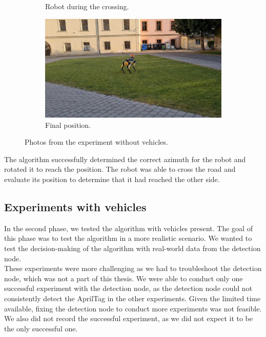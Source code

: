 \begin{figure}[ht]
\begin{subfigure}{0.49\textwidth}
                    \caption{Robot during the crossing.}
                \end{subfigure}
                \begin{subfigure}{0.49\textwidth}
                    \includegraphics[width=\textwidth]{images/final1.jpg}
                    \caption{Final position.}
                    \label{fig:final1}
                \end{subfigure}
                \caption{Photos from the experiment without vehicles.}
            \end{figure}
            The algorithm successfully determined the correct azimuth for the robot and rotated it to reach the position. The robot was able to cross the road and evaluate its position to determine that it had reached the other side.

    \subsection{Experiments with vehicles}
        In the second phase, we tested the algorithm with vehicles present. The goal of this phase was to test the algorithm in a more realistic scenario. We wanted to test the decision-making of the algorithm with real-world data from the detection node.\\
        These experiments were more challenging as we had to troubleshoot the detection node, which was not a part of this thesis. We were able to conduct only one successful experiment with the detection node, as the detection node could not consistently detect the AprilTag in the other experiments. Given the limited time available, fixing the detection node to conduct more experiments was not feasible. We also did not record the successful experiment, as we did not expect it to be the only successful one.

